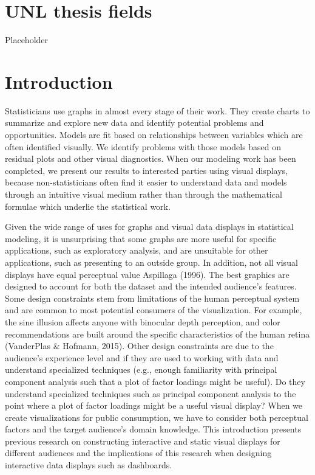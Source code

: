 \documentclass[print]{nuthesis}
\begin{document}
\hypertarget{unl-thesis-fields}{%
\chapter{UNL thesis fields}\label{unl-thesis-fields}}

Placeholder

\hypertarget{introduction}{%
\chapter{Introduction}\label{introduction}}

Statisticians use graphs in almost every stage of their work. They create charts to summarize and explore new data and identify potential problems and opportunities.
Models are fit based on relationships between variables which are often identified visually.
We identify problems with those models based on residual plots and other visual diagnostics.
When our modeling work has been completed, we present our results to interested parties using visual displays, because non-statisticians often find it easier to understand data and models through an intuitive visual medium rather than through the mathematical formulae which underlie the statistical work.

Given the wide range of uses for graphs and visual data displays in statistical modeling, it is unsurprising that some graphs are more useful for specific applications, such as exploratory analysis, and are unsuitable for other applications, such as presenting to an outside group.
In addition, not all visual displays have equal perceptual value Aspillaga (1996).
The best graphics are designed to account for both the dataset and the intended audience's features.
Some design constraints stem from limitations of the human perceptual system and are common to most potential consumers of the visualization.
For example, the sine illusion affects anyone with binocular depth perception, and color recommendations are built around the specific characteristics of the human retina (VanderPlas \& Hofmann, 2015).
Other design constraints are due to the audience's experience level and if they are used to working with data and understand specialized techniques (e.g., enough familiarity with principal component analysis such that a plot of factor loadings might be useful).
Do they understand specialized techniques such as principal component analysis to the point where a plot of factor loadings might be a useful visual display?
When we create visualizations for public consumption, we have to consider both perceptual factors and the target audience's domain knowledge.
This introduction presents previous research on constructing interactive and static visual displays for different audiences and the implications of this research when designing interactive data displays such as dashboards.
\end{document}
